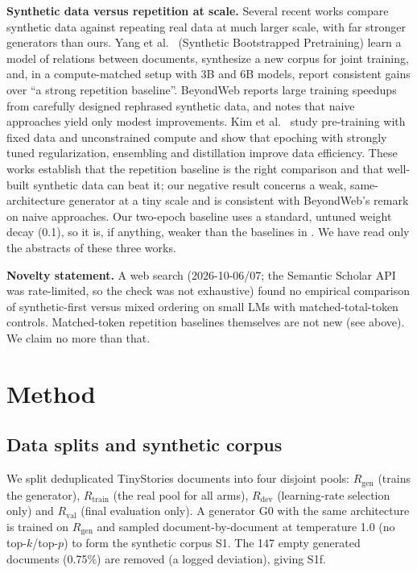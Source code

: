 \documentclass[conference]{IEEEtran}
\begin{document}
\textbf{Synthetic data versus repetition at scale.} Several recent works compare synthetic data against repeating real data at much larger scale, with far stronger generators than ours. Yang et al.\ \cite{yang2025sbp} (Synthetic Bootstrapped Pretraining) learn a model of relations between documents, synthesize a new corpus for joint training, and, in a compute-matched setup with 3B and 6B models, report consistent gains over ``a strong repetition baseline''. BeyondWeb \cite{maini2025beyondweb} reports large training speedups from carefully designed rephrased synthetic data, and notes that naive approaches yield only modest improvements. Kim et al.\ \cite{kim2025infinite} study pre-training with fixed data and unconstrained compute and show that epoching with strongly tuned regularization, ensembling and distillation improve data efficiency. These works establish that the repetition baseline is the right comparison and that well-built synthetic data can beat it; our negative result concerns a weak, same-architecture generator at a tiny scale and is consistent with BeyondWeb's remark on naive approaches. Our two-epoch baseline uses a standard, untuned weight decay (0.1), so it is, if anything, weaker than the baselines in \cite{kim2025infinite}. We have read only the abstracts of these three works.

\textbf{Novelty statement.} A web search (2026-10-06/07; the Semantic Scholar API was rate-limited, so the check was not exhaustive) found no empirical comparison of synthetic-first versus mixed ordering on small LMs with matched-total-token controls. Matched-token repetition baselines themselves are not new (see above). We claim no more than that.

\section{Method}
\subsection{Data splits and synthetic corpus}
We split deduplicated TinyStories documents into four disjoint pools: $R_{\text{gen}}$ (trains the generator), $R_{\text{train}}$ (the real pool for all arms), $R_{\text{dev}}$ (learning-rate selection only) and $R_{\text{val}}$ (final evaluation only). A generator G0 with the same architecture is trained on $R_{\text{gen}}$ and sampled document-by-document at temperature 1.0 (no top-$k$/top-$p$) to form the synthetic corpus S1. The 147 empty generated documents (0.75\%) are removed (a logged deviation), giving S1f.
\end{document}
